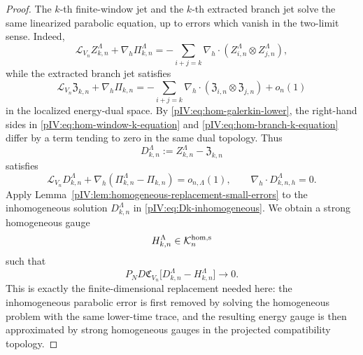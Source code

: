 \documentclass[11pt]{article}
\numberwithin{equation}{section}
\theoremstyle{plain}
\theoremstyle{definition}
\theoremstyle{remark}
\newcommand{\nabh}{\nabla_h}
\newcommand{\divh}{\nabla_h\!\cdot}
\newcommand{\calC}{\mathfrak C}
\newcommand{\calK}{\mathcal K}
\newcommand{\frakZ}{\mathfrak Z}
\newcommand{\frakPi}{\mathfrak{\Pi}}
\begin{document}
\begin{proof}
The \(k\)-th finite-window jet and the \(k\)-th extracted branch jet solve the same
linearized parabolic equation, up to errors which vanish in the two-limit sense.
Indeed,
\begin{equation}\label{pIV:eq:hom-window-k-equation}
        \mathcal L_{V_n}Z^\Lambda_{k,n}+\nabh\Pi^\Lambda_{k,n}
        =-
        \sum_{i+j=k}\nabh\cdot
        (Z^\Lambda_{i,n}\otimes Z^\Lambda_{j,n}),
\end{equation}
while the extracted branch jet satisfies
\begin{equation}\label{pIV:eq:hom-branch-k-equation}
        \mathcal L_{V_n}\frakZ_{k,n}+\nabh\frakPi_{k,n}
        =-
        \sum_{i+j=k}\nabh\cdot
        (\frakZ_{i,n}\otimes\frakZ_{j,n})+o_n(1)
\end{equation}
in the localized energy-dual space.  By \eqref{pIV:eq:hom-galerkin-lower}, the right-hand
sides in \eqref{pIV:eq:hom-window-k-equation} and \eqref{pIV:eq:hom-branch-k-equation}
differ by a term tending to zero in the same dual topology.  Thus
\[
        D^\Lambda_{k,n}:=Z^\Lambda_{k,n}-\frakZ_{k,n}
\]
satisfies
\begin{equation}\label{pIV:eq:Dk-inhomogeneous}
        \mathcal L_{V_n}D^\Lambda_{k,n}
        +\nabh(\Pi^\Lambda_{k,n}-\frakPi_{k,n})
        =o_{n,\Lambda}(1),
        \qquad
        \divh D^\Lambda_{k,n,h}=0.
\end{equation}
Apply Lemma~\ref{pIV:lem:homogeneous-replacement-small-errors} to the inhomogeneous
solution \(D^\Lambda_{k,n}\) in \eqref{pIV:eq:Dk-inhomogeneous}.  We obtain a strong
homogeneous gauge
\begin{equation}\label{pIV:eq:Hk-hom-approx}
        H^\Lambda_{k,n}\in\calK^{\rm hom,s}_n
\end{equation}
such that
\begin{equation}\label{pIV:eq:D-minus-H-small}
        P_ND\calC_{V_n}
        \bigl[D^\Lambda_{k,n}-H^\Lambda_{k,n}\bigr]\to0 .
\end{equation}
This is exactly the finite-dimensional replacement needed here: the inhomogeneous
parabolic error is first removed by solving the homogeneous problem with the same
lower-time trace, and the resulting energy gauge is then approximated by strong
homogeneous gauges in the projected compatibility topology.


\end{proof}
\end{document}
